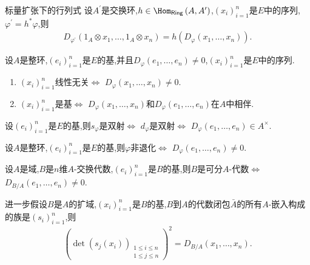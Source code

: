 \begin{corollary}{标量扩张下的行列式}{}
	设$A^{\prime}$是交换环,$h\in\Hom_{\mathsf{Ring}}\left(A,A^{\prime}\right)$,$\left(x_{i}\right)_{i=1}^{n}$是$E$中的序列,$\varphi^{\prime}=h^{\ast}\varphi$,则
	\begin{align*}
		D_{\varphi^{\prime}}\left(1_{A}\otimes x_{1},\ldots,1_{A}\otimes x_{n}\right)=h\left(D_{\varphi}\left(x_{1},\ldots,x_{n}\right)\right).
	\end{align*}
\end{corollary}

\begin{proposition}{}{}
	设$A$是整环,$\left(e_{i}\right)_{i=1}^{n}$是$E$的基,并且$D_{\varphi}\left(e_{1},\ldots,e_{n}\right)\neq 0$,$\left(x_{i}\right)_{i=1}^{n}$是$E$中的序列.
	\begin{enumerate}
		\item $\left(x_{i}\right)_{i=1}^{n}$线性无关$\iff$ $D_{\varphi}\left(x_{1},\ldots,x_{n}\right)\neq 0$.
		\item $\left(x_{i}\right)_{i=1}^{n}$是基$\iff$ $D_{\varphi}\left(x_{1},\ldots,x_{n}\right)$和$D_{\varphi}\left(e_{1},\ldots,e_{n}\right)$在$A$中相伴.
	\end{enumerate}
\end{proposition}

\begin{proposition}{}{}
	设$\left(e_{i}\right)_{i=1}^{n}$是$E$的基,则$s_{\varphi}$是双射$\iff$ $d_{\varphi}$是双射$\iff$ $D_{\varphi}\left(e_{1},\ldots,e_{n}\right)\in A^{\times}$.
\end{proposition}

\begin{proposition}{}{}
	设$A$是整环,$\left(e_{i}\right)_{i=1}^{n}$是$E$的基,则$\varphi$非退化$\iff$ $D_{\varphi}\left(e_{1},\ldots,e_{n}\right)\neq 0$.
\end{proposition}

\begin{proposition}{}{}
	设$A$是域,$B$是$n$维$A$-交换代数,$\left(e_{i}\right)_{i=1}^{n}$是$B$的基,则$B$是可分$A$-代数$\iff$ $D_{B/A}\left(e_{1},\ldots,e_{n}\right)\neq 0$.
\end{proposition}

\begin{remark}{}{}
	进一步假设$B$是$A$的扩域,$\left(x_{i}\right)_{i=1}^{n}$是$B$的基,$B$到$A$的代数闭包$\bar{A}$的所有$A$-嵌入构成的族是$\left(s_{i}\right)_{i=1}^{n}$,则
	\begin{align*}
		\left(\det\left(s_{j}\left(x_{i}\right)\right)_{\substack{1\leq i\leq n\\1\leq j\leq n}}\right)^{2}=D_{B/A}\left(x_{1},\ldots,x_{n}\right).
	\end{align*}
\end{remark}

